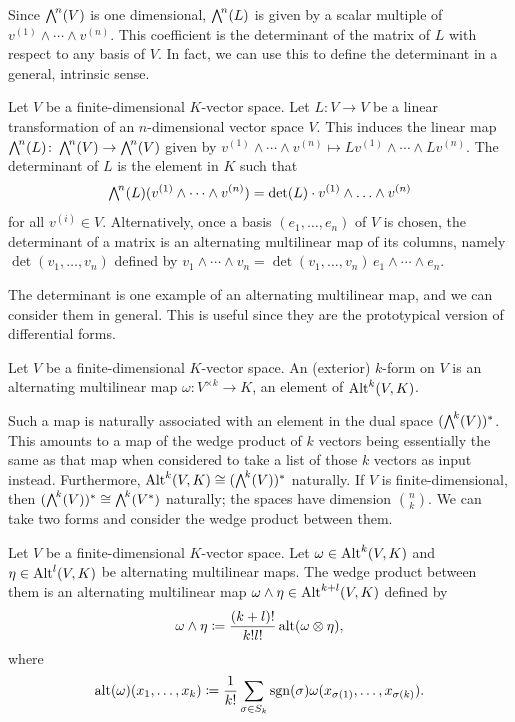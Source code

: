 \documentclass[a4paper,12pt]{article}
\begin{document}
Since $\extp^n(V)$ is one dimensional, $\extp^n(L)$ is given by a scalar multiple of $v^{(1)} \wedge \cdots \wedge v^{(n)}$.
This coefficient is the determinant of the matrix of $L$ with respect to any basis of $V$.
In fact, we can use this to define the determinant in a general, intrinsic sense.
\begin{definition}[Determinant]\label{def:determinant}
    Let $V$ be a finite-dimensional $K$-vector space.
    Let $L \colon V \to V$ be a linear transformation of an $n$-dimensional vector space $V$.
    This induces the linear map $\extp^n(L) \colon \extp^n(V) \to \extp^n(V)$ given by $v^{(1)} \wedge \cdots \wedge v^{(n)} \mapsto Lv^{(1)} \wedge \cdots \wedge Lv^{(n)}$.
    The determinant of $L$ is the element in $K$ such that
    \begin{equation}\label{eq:determinant_definition}
        \extp^n(L)(v^{(1)} \wedge \cdots \wedge v^{(n)}) = \det(L) \cdot v^{(1)} \wedge \ldots \wedge v^{(n)}
    \end{equation}
    for all $v^{(i)} \in V$.
    Alternatively, once a basis $(e_1, \ldots, e_n)$ of $V$ is chosen, the determinant of a matrix is an alternating multilinear map of its columns, namely $\det(v_1, \ldots, v_n)$ defined by $v_1 \wedge \cdots \wedge v_n = \det(v_1, \ldots, v_n) \, e_1 \wedge \cdots \wedge e_n$.
\end{definition}
The determinant is one example of an alternating multilinear map, and we can consider them in general.
This is useful since they are the prototypical version of differential forms.
\begin{definition}\label{def:exterior_form}
    Let $V$ be a finite-dimensional $K$-vector space.
    An (exterior) $k$-form on $V$ is an alternating multilinear map $\omega \colon V^{\times k} \to K$, an element of $\operatorname{Alt}^k(V, K)$.
\end{definition}
Such a map is naturally associated with an element in the dual space $(\extp^k(V))^*$.
This amounts to a map of the wedge product of $k$ vectors being essentially the same as that map when considered to take a list of those $k$ vectors as input instead.
Furthermore, $\Alt^k(V, K) \cong (\extp^k(V))^*$ naturally.
If $V$ is finite-dimensional, then $(\extp^k(V))^* \cong \extp^k(V^*)$ naturally; the spaces have dimension $\binom{n}{k}$.
We can take two forms and consider the wedge product between them.
\begin{definition}\label{def:wedge_product_of_forms}
    Let $V$ be a finite-dimensional $K$-vector space.
    Let $\omega \in \operatorname{Alt}^k(V, K)$ and $\eta \in \operatorname{Alt}^l(V, K)$ be alternating multilinear maps.
    The wedge product between them is an alternating multilinear map $\omega \wedge \eta \in \operatorname{Alt}^{k+l}(V, K)$ defined by
    \begin{equation}
        \omega \wedge \eta \coloneq \frac{(k+l)!}{k!l!} \operatorname{alt}(\omega \otimes \eta),
    \end{equation}
    where
    \begin{equation}
        \operatorname{alt}(\omega)(x_1, \ldots, x_k) \coloneq \frac{1}{k!} \sum_{\sigma \in S_k} \operatorname{sgn}(\sigma) \omega(x_{\sigma(1)}, \ldots, x_{\sigma(k)}).
    \end{equation}
\end{definition}
\end{document}
